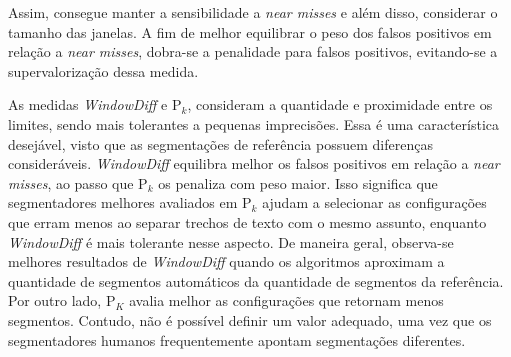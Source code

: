 Assim, consegue manter a sensibilidade a \textit{near misses} e além disso, considerar o tamanho das janelas.  A fim de melhor equilibrar o peso dos falsos positivos em relação a \textit{near misses}, dobra-se a penalidade para falsos positivos, evitando-se a supervalorização dessa medida.  %

As medidas \textit{WindowDiff} e P$_k$, consideram a quantidade e proximidade entre os limites, sendo mais tolerantes a pequenas imprecisões. Essa é uma característica desejável, visto que as segmentações de referência possuem diferenças consideráveis. \textit{WindowDiff} equilibra melhor os falsos positivos em relação a \textit{near misses}, ao passo que P$_k$ os penaliza com peso maior. Isso significa que segmentadores melhores avaliados em P$_k$ ajudam a selecionar as configurações que erram menos ao separar trechos de texto com o mesmo assunto, enquanto \textit{WindowDiff} é mais tolerante nesse aspecto.  De maneira geral, observa-se  melhores resultados de \textit{WindowDiff} quando os algoritmos aproximam a quantidade de segmentos automáticos da quantidade de segmentos da referência. Por outro lado, P$_K$ avalia melhor as configurações que retornam menos segmentos. Contudo, não é possível definir um valor adequado, uma vez que os segmentadores humanos frequentemente apontam segmentações diferentes.


